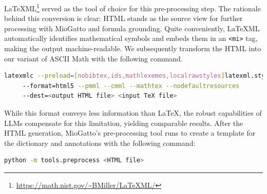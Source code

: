 \LaTeX ML\footnote{\url{https://math.nist.gov/~BMiller/LaTeXML/}} \citep{ginev2011latexml} served as the tool of choice for this pre-processing step. The rationale behind this conversion is clear: HTML stands as the source view for further processing with MioGatto and formula grounding. Quite conveniently, \LaTeX ML automatically identifies mathematical symbols and embeds them in an \lstinline{<mi>} tag, making the output machine-readable. We subsequently transform the HTML into our variant of ASCII Math with the following command.

\begin{lstlisting}[language=bash]
latexmlc --preload=[nobibtex,ids,mathlexemes,localrawstyles]latexml.sty
     --format=html5 --pmml --cmml --mathtex --nodefaultresources 
     --dest=<output HTML file> <input TeX file>
\end{lstlisting}

While this format conveys less information than \LaTeX, the robust capabilities of LLMs compensate for this limitation, yielding comparable results. After the HTML generation, MioGatto's pre-processing tool runs to create a template for the dictionary and annotations with the following command: 
  \begin{lstlisting}[language=bash]
    python -m tools.preprocess <HTML file>
  \end{lstlisting}



